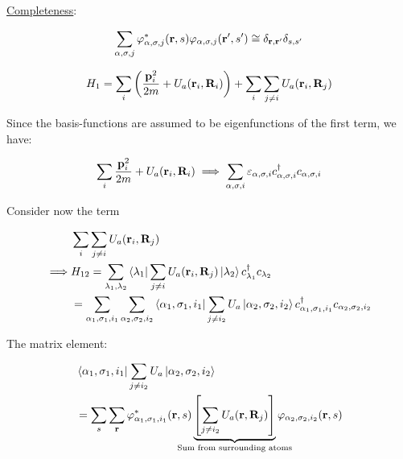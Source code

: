 \noindent \uline{Completeness}:

\begin{align*}
	\sum_{\alpha, \sigma, j} \varphi^*_{\alpha, \sigma,j}(\vb{r},s)\varphi_{\alpha, \sigma,j}(\vb{r}',s') \cong \delta_{\vb{r},\vb{r}'} \delta_{s,s'} 
\end{align*}

\begin{align*}
	H_1 = \sum_i \left( \frac{\vb{p}_i^2}{2m}+ U_a (\vb{r}_i, \vb{R}_i) \right) + \sum_i \sum_{j \neq i} U_a ( \vb{r}_i, \vb{R}_j)
\end{align*}

\noindent Since the basis-functions are assumed to be eigenfunctions of the first term, we have:

\begin{equation}
	\sum_i  \frac{\vb{p}_i^2}{2m}+ U_a (\vb{r}_i, \vb{R}_i)\implies  \sum_{\alpha, \sigma, i} \varepsilon_{\alpha, \sigma, i} c^{\dagger}_{\alpha, \sigma, i} c_{\alpha, \sigma, i}
\end{equation}

\noindent Consider now the term

\begin{align*}
	& \sum_i \sum_{j \neq i} U_a ( \vb{r}_i, \vb{R}_j)\\
	\implies & H_{12} = \sum_{{\lambda_{1}}, {\lambda_{2}}} \bra{\lambda_{1}}  \sum_{j \neq i} U_a ( \vb{r}_i, \vb{R}_j) \ket{\lambda_{2}} c^{\dagger}_{ \lambda_1} c_{\lambda_{2}}\\
	&= \sum_{\alpha_1, \sigma_1, i_1} \sum_{\alpha_2, \sigma_2, i_2} \bra{\alpha_1, \sigma_1, i_1} \sum_{j \neq i_2} U_a \ket{\alpha_2, \sigma_2, i_2} c^{\dagger}_{\alpha_1, \sigma_1, i_1} c_{\alpha_2, \sigma_2, i_2}
\end{align*}

The matrix element: 

\begin{align*}
	&\bra{\alpha_1, \sigma_1, i_1} \sum_{j \neq i_2} U_a \ket{\alpha_2, \sigma_2, i_2}\\
	&= \sum_s \sum_{\vb{r}} \varphi_{\alpha_1, \sigma_1, i_1}^* (\vb{r},s) \underbrace{\left[\sum_{j\ne i_2} U_a (\vb{r},\vb{R}_j) \right] }_{\mathclap{\text{Sum from surrounding atoms}}}  \varphi_{\alpha_2, \sigma_2, i_2}(\vb{r},s)
\end{align*}

